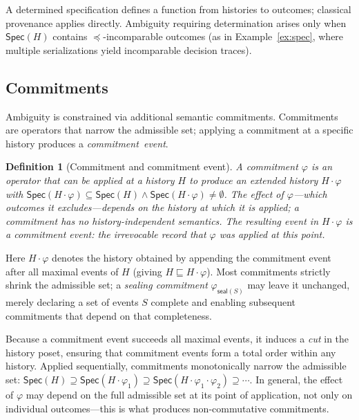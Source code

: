 \documentclass[acmsmall,review,anonymous]{acmart}
\newcommand{\Spec}{\mathsf{Spec}}
\newcommand{\seal}{\mathsf{seal}}
\newcommand{\Ord}{\preceq}
\newtheorem{definition}{Definition}
\theoremstyle{remark}
\numberwithin{definition}{section}
\numberwithin{theorem}{section}
\numberwithin{lemma}{section}
\numberwithin{corollary}{section}
\numberwithin{remark}{section}
\numberwithin{example}{section}
\numberwithin{observation}{section}
\numberwithin{assumption}{section}
\begin{document}
\noindent
A determined specification defines a function from histories to
outcomes; classical provenance applies directly.
Ambiguity requiring determination arises only when $\Spec(H)$ contains
$\Ord$-incomparable outcomes (as in Example~\ref{ex:spec}, where
multiple serializations yield incomparable decision traces).


\subsection{Commitments}

Ambiguity is constrained via additional semantic commitments.
Commitments are operators that narrow the admissible set;
applying a commitment at a specific history produces a
\mbox{\emph{commitment event}.}

\begin{definition}[Commitment and commitment event]
  \label{def:commitment}%
  A \emph{commitment} $\varphi$ is an operator that can be applied at a
  history $H$ to produce an extended history $H \cdot \varphi$ with
  $\Spec(H \cdot \varphi) \subseteq \Spec(H) \wedge \Spec(H \cdot \varphi) \neq \emptyset$.
  The effect of $\varphi$---which outcomes it excludes---depends on the
  history at which it is applied; a commitment has no
  history-independent semantics.
  The resulting event in $H \cdot \varphi$ is a \emph{commitment event}:
  the irrevocable record that $\varphi$ was applied at this point.
\end{definition}

\noindent
Here $H \cdot \varphi$ denotes the history obtained by appending
the commitment event after all maximal events of $H$ (giving
$H \sqsubseteq H \cdot \varphi$).
Most commitments strictly shrink the admissible set; a
\emph{sealing commitment} $\varphi_{\seal(S)}$ may leave it unchanged,
merely declaring a set of events $S$ complete and enabling subsequent
commitments that depend on that completeness.

Because a commitment event succeeds all maximal events, it induces a
\emph{cut} in the history poset, ensuring that commitment events form a
total order within any history.
Applied sequentially, commitments monotonically narrow the admissible
set:
$\Spec(H) \supseteq \Spec(H \cdot \varphi_1) \supseteq
\Spec(H \cdot \varphi_1 \cdot \varphi_2) \supseteq \cdots$.
In general, the effect of $\varphi$ may depend on the
full admissible set at its point of application, not only on individual
outcomes---this is what produces non-commutative commitments.
\end{document}
